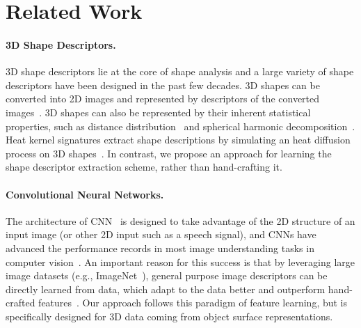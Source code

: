 \section{Related Work}
\label{sec:related_work}

\vspace{-0.2cm}

\paragraph{3D Shape Descriptors.} 3D shape descriptors lie at the core of shape analysis and a large variety of shape descriptors have been designed in the past few decades. 3D shapes can be converted into 2D images and represented by descriptors of the converted images~\cite{Johnson_TPAMI99_Using,Chen_CGF03_On}. 3D shapes can also be represented by their inherent statistical properties, such as distance distribution~\cite{Osada_ToG02_Shape} and spherical harmonic decomposition~\cite{Kazhdan_SGP03_Rotation}. Heat kernel signatures extract shape descriptions by simulating an heat diffusion process on 3D shapes~\cite{Sun_SGP09_A,Bronstein_ToG11_Shape}. In contrast, we propose an approach for learning the shape descriptor extraction scheme, rather than hand-crafting it.

\vspace{-0.1cm}

\paragraph{Convolutional Neural Networks.} The architecture of CNN~\cite{Lecun_IEEE98_Gradient} is designed to take advantage of the 2D structure of an input image (or other 2D input such as a speech signal), and CNNs have advanced the performance records in most image understanding tasks in computer vision~\cite{Russakovsky_IJCV15_ImageNet}. An important reason for this success is that by leveraging large image datasets (e.g., ImageNet~\cite{Deng_CVPR09_ImageNet}), general purpose image descriptors can be directly learned from data, which adapt to the data better and outperform hand-crafted features~\cite{LeCun_Nature15_Deep}. Our approach follows this paradigm of feature learning, but is specifically designed for 3D data coming from object surface representations.

